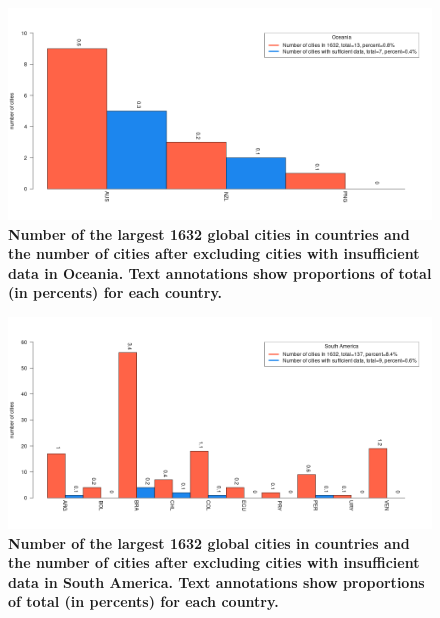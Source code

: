 \documentclass[preprint,10pt]{elsarticle} %
\begin{document}
\begin{figure}
\centering
\includegraphics[trim={ 0 35 25 50 },clip,scale=0.45]{Images2/Oceania_cities_Rev2.png}
\caption{\bf Number of the largest 1632 global cities in countries and the number of cities after excluding cities with insufficient data in Oceania. Text annotations show proportions of total (in percents) for each country.}
 \label{fig:oceania}
\end{figure}

\begin{figure}
\centering
\includegraphics[trim={ 0 35 25 50 },clip,scale=0.45]{Images2/South America_cities_Rev2.png}
\caption{\bf Number of the largest 1632 global cities in countries and the number of cities after excluding cities with insufficient data in South America. Text annotations show proportions of total (in percents) for each country.}
 \label{fig:southhamerica}
\end{figure}
\end{document}
